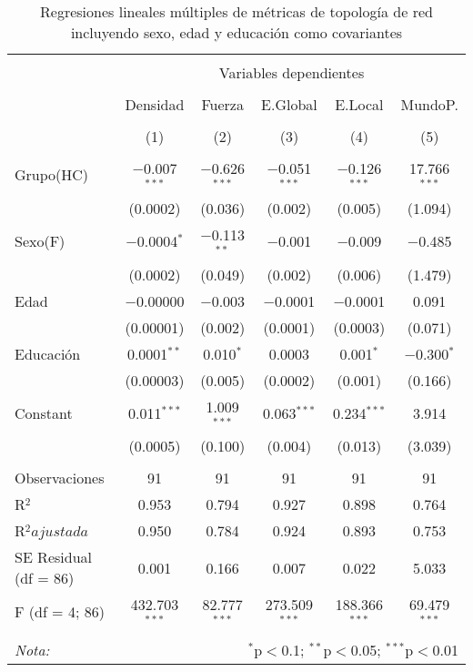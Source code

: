 \begin{table}[!htbp] \centering
  \caption{Regresiones lineales múltiples de métricas de topología de red incluyendo sexo, edad y educación como covariantes}
  \label{tab:lmHC}
  \small
\begin{tabular}{@{\extracolsep{5pt}}lccccc}
\\[-1.8ex]\hline
\hline \\[-1.8ex]
 & \multicolumn{5}{c}{Variables dependientes} \\
\cline{2-6}
\\[-1.8ex] & Densidad & Fuerza & E.Global & E.Local & MundoP. \\
\\[-1.8ex] & (1) & (2) & (3) & (4) & (5)\\
\hline \\[-1.8ex]
 Grupo(HC) & $-$0.007$^{***}$ & $-$0.626$^{***}$ & $-$0.051$^{***}$ & $-$0.126$^{***}$ & 17.766$^{***}$ \\
  & (0.0002) & (0.036) & (0.002) & (0.005) & (1.094) \\
  Sexo(F) & $-$0.0004$^{*}$ & $-$0.113$^{**}$ & $-$0.001 & $-$0.009 & $-$0.485 \\
  & (0.0002) & (0.049) & (0.002) & (0.006) & (1.479) \\
  Edad & $-$0.00000 & $-$0.003 & $-$0.0001 & $-$0.0001 & 0.091 \\
  & (0.00001) & (0.002) & (0.0001) & (0.0003) & (0.071) \\
  Educación & 0.0001$^{**}$ & 0.010$^{*}$ & 0.0003 & 0.001$^{*}$ & $-$0.300$^{*}$ \\
  & (0.00003) & (0.005) & (0.0002) & (0.001) & (0.166) \\
  Constant & 0.011$^{***}$ & 1.009$^{***}$ & 0.063$^{***}$ & 0.234$^{***}$ & 3.914 \\
  & (0.0005) & (0.100) & (0.004) & (0.013) & (3.039) \\
 \hline \\[-1.8ex]
Observaciones & 91 & 91 & 91 & 91 & 91 \\
R$^{2}$ & 0.953 & 0.794 & 0.927 & 0.898 & 0.764 \\
R$^{2} ajustada$ & 0.950 & 0.784 & 0.924 & 0.893 & 0.753 \\
SE Residual (df = 86) & 0.001 & 0.166 & 0.007 & 0.022 & 5.033 \\
F (df = 4; 86) & 432.703$^{***}$ & 82.777$^{***}$ & 273.509$^{***}$ & 188.366$^{***}$ & 69.479$^{***}$ \\
\hline
\hline \\[-1.8ex]
\textit{Nota:}  & \multicolumn{5}{r}{$^{*}$p$<$0.1; $^{**}$p$<$0.05; $^{***}$p$<$0.01} \\
\end{tabular}
\end{table}


